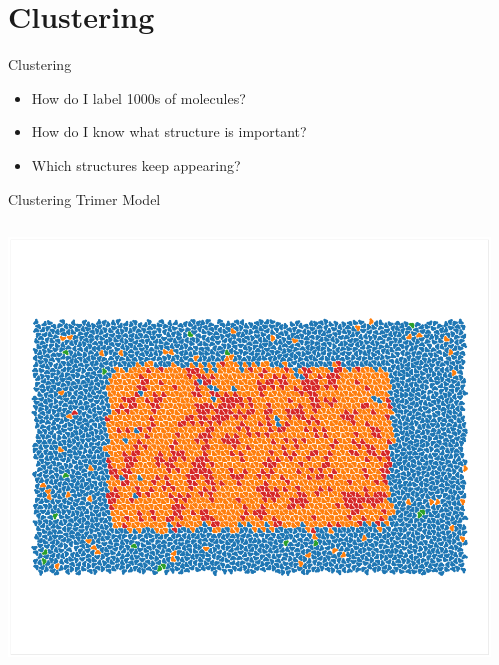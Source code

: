 \documentclass[aspectratio=169, 14pt]{beamer}
\begin{document}
\section{Clustering}
\begin{frame}{Clustering}

  \begin{itemize}
    \item How do I label 1000s of molecules?
    \item How do I know what structure is important?
    \item Which structures keep appearing?
  \end{itemize}

\end{frame}

\begin{frame}{Clustering Trimer Model}
  \begin{columns}
    \begin{column}{0.33\textwidth}
      \includegraphics[width=\textwidth]{clustering_results_p2.png}
    \end{column}
    \begin{column}{0.33\textwidth}

\end{column}
\end{columns}
\end{frame}
\end{document}
